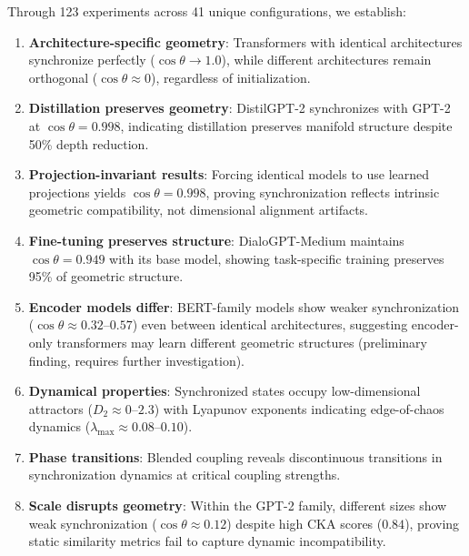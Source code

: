 \documentclass[10pt]{article} %
\theoremstyle{plain}
\theoremstyle{definition}
\theoremstyle{remark}
\begin{document}
Through 123 experiments across 41 unique configurations, we establish:

\begin{enumerate}
    \item \textbf{Architecture-specific geometry}: Transformers with identical architectures synchronize perfectly ($\cos \theta \to 1.0$), while different architectures remain orthogonal ($\cos \theta \approx 0$), regardless of initialization.

    \item \textbf{Distillation preserves geometry}: DistilGPT-2 synchronizes with GPT-2 at $\cos \theta = 0.998$, indicating distillation preserves manifold structure despite 50\% depth reduction.

    \item \textbf{Projection-invariant results}: Forcing identical models to use learned projections yields $\cos \theta = 0.998$, proving synchronization reflects intrinsic geometric compatibility, not dimensional alignment artifacts.

    \item \textbf{Fine-tuning preserves structure}: DialoGPT-Medium maintains $\cos \theta = 0.949$ with its base model, showing task-specific training preserves 95\% of geometric structure.

    \item \textbf{Encoder models differ}: BERT-family models show weaker synchronization ($\cos \theta \approx 0.32$--$0.57$) even between identical architectures, suggesting encoder-only transformers may learn different geometric structures (preliminary finding, requires further investigation).

    \item \textbf{Dynamical properties}: Synchronized states occupy low-dimensional attractors ($D_2 \approx 0$--$2.3$) with Lyapunov exponents indicating edge-of-chaos dynamics ($\lambda_{\max} \approx 0.08$--$0.10$).

    \item \textbf{Phase transitions}: Blended coupling reveals discontinuous transitions in synchronization dynamics at critical coupling strengths.

    \item \textbf{Scale disrupts geometry}: Within the GPT-2 family, different sizes show weak synchronization ($\cos \theta \approx 0.12$) despite high CKA scores ($0.84$), proving static similarity metrics fail to capture dynamic incompatibility.
\end{enumerate}
\end{document}
